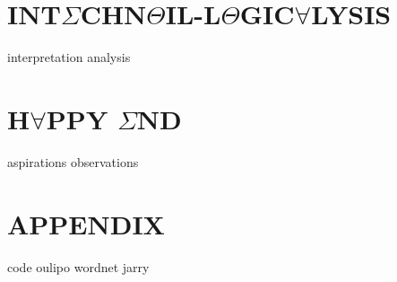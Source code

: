 \documentclass[oneside]{thesis}
\begin{document}
\part{\texorpdfstring{INT$\Sigma$CHN$\Theta$IL-L$\Theta$GIC$\forall$LYSIS}{INTECHNOIL-LOGICALYSIS}}
{interpretation}
{analysis}

\part{\texorpdfstring{H$\forall$PPY $\Sigma$ND}{HAPPY END}}
{aspirations}
{observations}

\backmatter

\appendix

\part{APPENDIX}
{code}
{oulipo}
{wordnet}
{jarry}
\clearpage

\pagestyle{plain}
{}
\clearpage

{}
\printnoidxglossary
\clearpage
\end{document}

